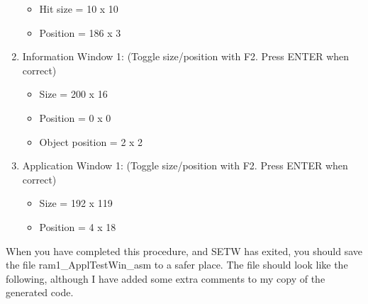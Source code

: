 \begin{enumerate}
{\begin{itemize}[itemsep=0pt]
\item{}Hit size = 10 x 10

\item{}Position = 186 x 3

\end{itemize}
}
\item{Information Window 1: (Toggle size/position with F2. Press ENTER
        when correct)
\begin{itemize}[itemsep=0pt]

\item{}Size = 200 x 16

\item{}Position = 0 x 0

\item{}Object position = 2 x 2

\end{itemize}
}
\item{Application Window 1: (Toggle size/position with F2. Press ENTER
        when correct)
\begin{itemize}[itemsep=0pt]

\item{}Size = 192 x 119

\item{}Position = 4 x 18

\end{itemize}
}
\end{enumerate}

When you have completed this procedure, and
 SETW has exited, you should save the file
 ram1\_ApplTestWin\_asm to a safer place. The file
    should look like the following, although I have added some extra comments
    to my copy of the generated code.

